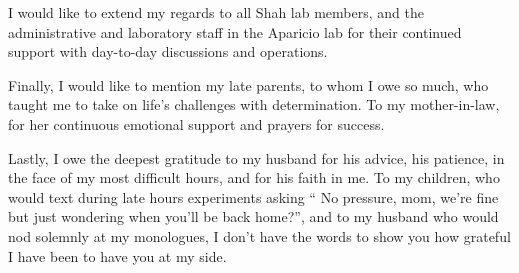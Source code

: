 I would like to extend my regards to all Shah lab members, and the administrative and laboratory staff in the Aparicio lab for their continued support with day-to-day discussions and operations.

Finally, I would like to mention my late parents, to whom I owe so much, who taught me to take on life's challenges with determination. To my mother-in-law, for her continuous emotional support and prayers for success. 

Lastly, I owe the deepest gratitude to my husband for his advice, his patience, in the face of my most difficult hours, and for his faith in me. To my children, who would text during late hours experiments asking  `` No pressure, mom, we're fine but just wondering when you'll be back home?'', and to my husband who would nod solemnly at my monologues, I don't have the words to show you how grateful I have been to have you at my side.